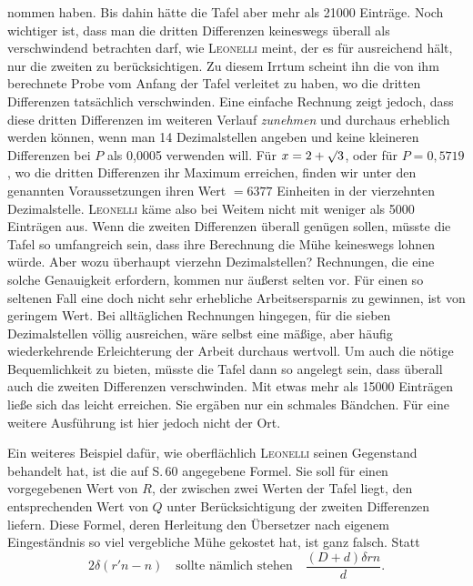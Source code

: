 nommen haben. Bis dahin hätte die Tafel aber mehr als 21000 Einträge. Noch wichtiger ist, dass man die dritten Differenzen keineswegs überall als verschwindend betrachten darf, wie \textsc{Leonelli} meint, der es für ausreichend hält, nur die zweiten zu berücksichtigen. Zu diesem Irrtum scheint ihn die von ihm berechnete Probe vom Anfang der Tafel verleitet zu haben, wo die dritten Differenzen tatsächlich verschwinden. Eine einfache Rechnung zeigt jedoch, dass diese dritten Differenzen im weiteren Verlauf \emph{zunehmen} und durchaus erheblich werden können, wenn man 14 Dezimalstellen angeben und keine kleineren Differenzen bei $P$ als 0,0005 verwenden will. Für $x = 2+\mathord{\surd}3$, oder für $P = 0,5719$, wo die dritten Differenzen ihr Maximum erreichen, finden wir unter den genannten Voraussetzungen ihren Wert $= 6377$ Einheiten in der vierzehnten Dezimalstelle. \textsc{Leonelli} käme also bei Weitem nicht mit weniger als 5000 Einträgen aus. Wenn die zweiten Differenzen überall genügen sollen, müsste die Tafel so umfangreich sein, dass ihre Berechnung die Mühe keineswegs lohnen würde. Aber wozu überhaupt vierzehn Dezimalstellen? Rechnungen, die eine solche Genauigkeit erfordern, kommen nur äußerst selten vor. Für einen so seltenen Fall eine doch nicht sehr erhebliche Arbeitsersparnis zu gewinnen, ist von geringem Wert. Bei alltäglichen Rechnungen hingegen, für die sieben Dezimalstellen völlig ausreichen, wäre selbst eine mäßige, aber häufig wiederkehrende Erleichterung der Arbeit durchaus wertvoll. Um auch die nötige Bequemlichkeit zu bieten, müsste die Tafel dann so angelegt sein, dass überall auch die zweiten Differenzen verschwinden. Mit etwas mehr als 15000 Einträgen ließe sich das leicht erreichen. Sie ergäben nur ein schmales Bändchen. Für eine weitere Ausführung ist hier jedoch nicht der Ort.

Ein weiteres Beispiel dafür, wie oberflächlich \textsc{Leonelli} seinen Gegenstand behandelt hat, ist die auf S.\,60 angegebene Formel. Sie soll für einen vorgegebenen Wert von $R$, der zwischen zwei Werten der Tafel liegt, den entsprechenden Wert von $Q$ unter Berücksichtigung der zweiten Differenzen liefern. Diese Formel, deren Herleitung den Übersetzer nach eigenem Eingeständnis so viel vergebliche Mühe gekostet hat, ist ganz falsch. Statt
\[
2\delta(r'n - n) \quad \text{sollte nämlich stehen} \quad \frac{(D+d)\delta rn}{d}.
\]
